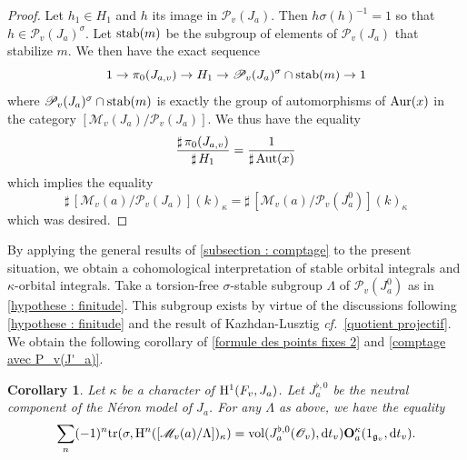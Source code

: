 \documentclass[12pt,english]{smfart}
\numberwithin{equation}{subsection}
\newtheorem{corollaire}[equation]{Corollary}
\theoremstyle{remark}
\newcommand\calP{{\mathscr P}}
\newcommand\calM{{\mathscr M}}
\newcommand\calO{{\mathscr O}}
\newcommand\frakg{{\mathfrak g}}
\newcommand\rmH{{\rm H}}
\newcommand\tr{{\rm tr}}
\newcommand\Aut{{\rm Aut}}
\newcommand\cf{{\it cf.\ }}
\begin{document}
\begin{proof}
Let $h_1\in H_1$ and $h$ its image in $\calP_v(J_a)$. Then $h
\sigma(h)^{-1}=1$ so that $h\in \calP_v(J_a)^\sigma$. Let ${\rm
stab}(m)$ be the subgroup of elements of $\calP_v(J_a)$ that stabilize
$m$. We then have the exact sequence
$$1\rightarrow \pi_0(J_{a,v})\rightarrow H_1 \rightarrow \calP_v(J_a)^\sigma\cap {\rm
stab}(m)\rightarrow 1
$$
where $\calP_v(J_a)^\sigma\cap {\rm stab}(m)$ is exactly the group of
automorphisms of ${\rm Aur}(x)$ in the category
$[\calM_v(J_a)/\calP_v(J_a)]$. We thus have the equality
$$\frac{{\sharp\,}\pi_0(J_{a,v})}{{\sharp\,} H_1}=\frac{1}{{\sharp\,}\Aut(x)}$$
which implies the equality
$${\sharp\,} [\calM_v(a)/\calP_v(J_a)](k)_\kappa= {\sharp\,} [\calM_v(a)/\calP_v(J_a^0)](k)_\kappa$$
which was desired.
\end{proof}

By applying the general results of \ref{subsection : comptage} to
the present situation, we obtain a cohomological interpretation of
stable orbital integrals and $\kappa$-orbital integrals. Take
a torsion-free $\sigma$-stable subgroup $\Lambda$ of $\calP_v(J_a^0)$
as in \ref{hypothese : finitude}. This subgroup exists by virtue of
the discussions following \ref{hypothese : finitude} and the result of
Kazhdan-Lusztig \cf \ref{quotient projectif}. We obtain the following corollary
of \ref{formule des points fixes 2} and \ref{comptage avec P_v(J'_a)}.

\begin{corollaire}
Let $\kappa$ be a character of $\rmH^1(F_v,J_a)$. Let $J_a^{\flat,0}$ be the
neutral component of the N\'eron model of $J_a$. For any $\Lambda$
as above, we have the equality
$$
\sum_n (-1)^n \tr(\sigma, \rmH^n([\calM_v(a)/\Lambda])_\kappa)
={\rm vol}(J_a^{\flat,0}(\calO_v) ,{\rm d}t_v) {\bf O}^\kappa_a(1_{\frakg_v},{\rm d}t_v).
$$
\end{corollaire}
\end{document}
